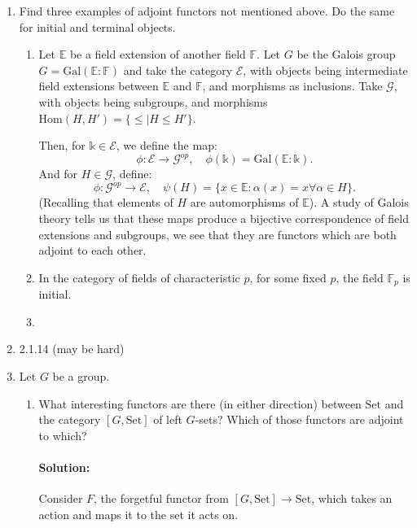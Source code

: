 \documentclass{article}
\begin{document}
\begin{enumerate} 
    \item Find three examples of adjoint functors not mentioned above. Do the same for initial and terminal objects.
        \begin{enumerate}
            \item Let $\mathbb{E}$ be a field extension of another field $\mathbb{F}$. Let $G$ be the Galois group $G=\mathrm{Gal}(\mathbb{E}:\mathbb{F})$ and take the category $\mathcal{E}$, with objects being intermediate field extensions between $\mathbb{E}$ and $\mathbb{F}$, and morphisms as inclusions. Take $\mathcal{G}$, with objects being subgroups, and morphisms $\mathrm{Hom}(H,H')=\{\leq |H\leq H'\} $.
                
                Then, for $\mathbb{k}\in \mathcal{E}$, we define the map:
                \[
                \phi:\mathcal{E}\to \mathcal{G}^{op},\quad\phi(\mathbb{k})= \mathrm{Gal}(\mathbb{E}:\mathbb{k})
                .\] 
                And for $H\in \mathcal{G}$, define:
                \[
                \phi:\mathcal{G}^{op}\to \mathcal{E},\quad\psi(H)=\{x\in \mathbb{E}:\alpha(x)=x\forall \alpha\in H\} 
                .\] 
                (Recalling that elements of $H$ are automorphisms of $\mathbb{E}$).
                A study of Galois theory tells us that these maps produce a bijective correspondence of field extensions and subgroups, we see that they are functors which are both adjoint to each other.
            \item In the category of fields of characteristic  $p$, for some fixed $p$, the field $\mathbb{F}_p$ is initial.
            \item 
        \end{enumerate}
    \item 2.1.14 (may be hard)

    \item Let $G$ be a group.
        \begin{enumerate}
            \item What interesting functors are there (in either direction) between $\mathrm{Set}$ and the category $[G, \mathrm{Set} ]$ of left $G$-sets? Which of those functors are adjoint to which?
                \paragraph{Solution: } Consider $F$, the forgetful functor from $[G,\mathrm{Set}]\to \mathrm{Set}$, which takes an action and maps it to the set it acts on.


\end{enumerate}
\end{enumerate}
\end{document}

